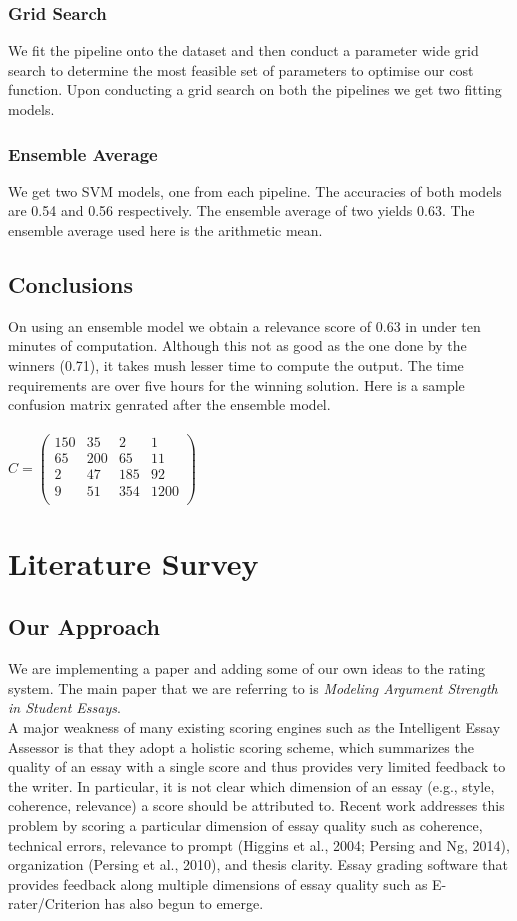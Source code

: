 \documentclass[BTech]{nitkdiss}
\begin{document}
\subsection{Grid Search}
We fit the pipeline onto the dataset and then conduct a parameter wide grid search to determine the most feasible set of parameters to optimise our cost function. Upon conducting a grid search on both the pipelines we get two fitting models. 
\subsection{Ensemble Average}
We get two SVM models, one from each pipeline. The accuracies of both models are 0.54 and 0.56 respectively. The ensemble average of two yields 0.63. The ensemble average used here is the arithmetic mean.
\section{Conclusions}
On using an ensemble model we obtain a relevance score of 0.63 in under ten minutes of computation. Although this not as good as the one done by the winners (0.71), it takes mush lesser time to compute the output. The time requirements are over five hours for the winning solution. Here is a sample confusion matrix genrated after the ensemble model.\\\\
$C = 
\begin{pmatrix}
150 & 35 & 2 & 1\\
65 & 200 & 65 & 11\\
2 & 47 & 185 & 92\\
9 & 51 & 354 & 1200\\
\end{pmatrix}$

\chapter{Literature Survey}
\section{Our Approach}
We are implementing a paper and adding some of our own ideas to the rating system. The main paper that we are referring to is \textit{Modeling Argument Strength in Student Essays}.\\

A major weakness of many existing scoring engines such as the Intelligent Essay Assessor is that they adopt a holistic scoring scheme, which summarizes the quality of an essay with a single score and thus provides very limited feedback to the writer. In particular, it is not clear which dimension of an essay (e.g., style, coherence, relevance) a score should be attributed to. Recent work addresses this problem by scoring a particular dimension of essay quality such as coherence, technical errors, relevance to prompt (Higgins et al., 2004; Persing and Ng, 2014), organization (Persing et al., 2010), and thesis clarity. Essay grading  software that provides feedback along multiple dimensions of essay quality such as E-rater/Criterion has also begun to emerge.\\
\end{document}
